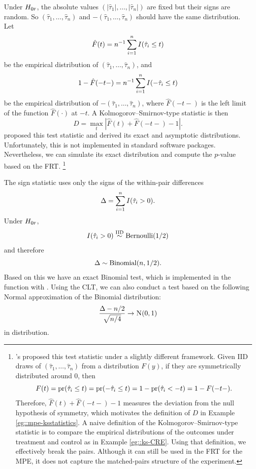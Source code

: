  
 
 
   \begin{example}
 \label{eg::mpe-ksstatistics}
Under $H_{0\textsc{f}}$, the absolute values $( | \hat{\tau}_1| , \ldots, | \hat{\tau}_n| )$ are fixed but their signs are random. So $   (  \hat{\tau}_1 , \ldots,  \hat{\tau}_n  )$ and $ -   (  \hat{\tau}_1 , \ldots,  \hat{\tau}_n  )$ should have the same distribution. 
Let 
$$
\hat{F}(t)  = n^{-1} \sum_{i=1}^n I( \hat{\tau}_i  \leq t  )
$$
be the empirical distribution of $  (  \hat{\tau}_1 , \ldots,  \hat{\tau}_n  )$, and
$$
1 - \hat{F}(-t-)  =    n^{-1} \sum_{i=1}^n I( -  \hat{\tau}_i  \leq t  )
$$ 
be the empirical distribution of $ -   (  \hat{\tau}_1 , \ldots,  \hat{\tau}_n  )$, where $\hat{F}(-t-)$ is the left limit of the function $\hat{F}(\cdot)$ at $-t$. 
A Kolmogorov--Smirnov-type statistic is then 
$$
D = \max_t |  \hat{F}(t)  +  \hat{F}(-t-)  - 1  |.
$$
\citet{butler1969test} proposed this test statistic and derived its exact and asymptotic distributions. Unfortunately, this is not implemented in standard software packages. Nevertheless, we can simulate its exact distribution and compute the $p$-value based on the FRT. \footnote{
\citet{butler1969test}'s proposed this test statistic under a slightly different framework. Given IID draws of $    (  \hat{\tau}_1 , \ldots,  \hat{\tau}_n  )$ from a  distribution $F(y)$, if they are symmetrically distributed around $0$, then
$$
F(t) = \textup{pr}( \hat{\tau}_i \leq t ) =  \textup{pr}( -  \hat{\tau}_i \leq t )  = 1 - \textup{pr}( \hat{\tau}_i <- t) = 1 - F(-t-).
$$
Therefore, $\hat{F}(t)  +  \hat{F}(-t-)  - 1 $ measures the deviation from the null hypothesis of symmetry, which motivates the definition of $D$ in Example \ref{eg::mpe-ksstatistics}. A naive definition of the Kolmogorov--Smirnov-type statistic is to compare the empirical distributions of the outcomes under treatment and control as in Example \ref{eg::ks-CRE}. Using that definition, we effectively break the pairs. Although it can still be used in the FRT for the MPE, it does not capture the matched-pairs structure of the experiment.}
 \end{example}
 
 
 
 
 
  \begin{example}
 \label{eg::mpe-sign}
 The sign statistic uses only the signs of the within-pair differences
 $$
 \Delta = \sum_{i=1}^n I( \hat{\tau}_i > 0 ).
 $$
 Under $H_{0\textsc{f}}$, 
 $$
 I( \hat{\tau}_i > 0 ) \stackrel{\textup{IID}}{\sim} \textup{Bernoulli}(1/2)
 $$
 and therefore 
 $$
  \Delta \sim \textup{Binomial}(n, 1/2).
 $$
 Based on this we have an exact Binomial test, which is implemented in the  function 
 with . Using the CLT, we can also conduct a test based on the following Normal approximation of the Binomial distribution: 
$$
\frac{  \Delta - n/2 }{  \sqrt{n/4} } \rightarrow \N01 
$$
in distribution. 
 \end{example}
 
